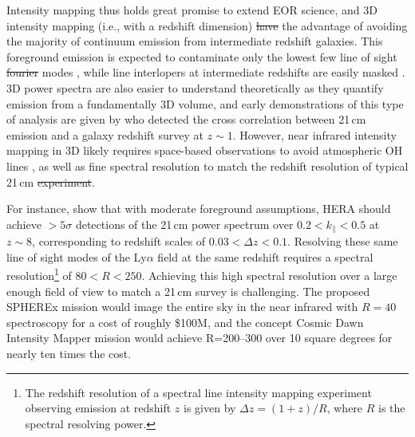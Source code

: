 \documentclass[numberedappendix]{emulateapj}
\providecommand{\DIFadd}[1]{{\protect\color{blue}\uwave{#1}}} %
\providecommand{\DIFdel}[1]{{\protect\color{red}\sout{#1}}}                      %
\providecommand{\DIFaddbegin}{} %
\providecommand{\DIFaddend}{} %
\providecommand{\DIFdelbegin}{} %
\providecommand{\DIFdelend}{} %
\begin{document}
Intensity mapping thus holds great promise to extend EOR science, and 3D intensity mapping (i.e., with a redshift dimension) \DIFdelbegin \DIFdel{have }\DIFdelend \DIFaddbegin \DIFadd{has }\DIFaddend the advantage of avoiding the majority of continuum emission from intermediate redshift galaxies. This foreground emission is expected to contaminate only the lowest few line of sight \DIFdelbegin \DIFdel{fourier }\DIFdelend \DIFaddbegin \DIFadd{Fourier }\DIFaddend modes \citep{gong17}, while line interlopers at intermediate redshifts are easily masked \citep{Gong2014,gong17,pullen14,Comaschi16}. 3D power spectra are also easier to understand theoretically as they quantify emission from a fundamentally 3D volume, and early demonstrations of this type of analysis are given by \citet{Chang2010,Masui2013} who detected the cross correlation between 21\,cm emission and a galaxy redshift survey at $z\sim1$. However, near infrared intensity mapping in 3D likely requires space-based observations to avoid atmospheric OH lines \citep[e.g.][]{sullivan12}, as well as fine spectral resolution to match the redshift resolution of typical 21\,cm \DIFdelbegin \DIFdel{experiment}\DIFdelend \DIFaddbegin \DIFadd{experiments}\DIFaddend . 

For instance, \citet{PoberNextGen} show that with moderate foreground assumptions, HERA should achieve $>5\sigma$ detections of the 21\,cm power spectrum 	over $0.2<k_\parallel<0.5$ at $z\sim8$, corresponding to redshift scales of $0.03<\Delta z<0.1$. Resolving these same line of sight modes of the Ly$\alpha$ field at the same redshift requires a spectral resolution\footnote{The redshift resolution of a spectral line intensity mapping experiment observing emission at redshift $z$ is given by $\Delta z=(1+z)/R$, where $R$ is the spectral resolving power.} of $80<R<250$. Achieving this high spectral resolution over a large enough field of view to match a 21\,cm survey is challenging. The proposed SPHEREx mission \citep{ScienceWithSpherex,SpherexWhitePaper} would image the entire sky in the near infrared with $R=40$ spectroscopy for a cost of roughly \$100M, and the concept Cosmic Dawn Intensity Mapper \citep{cooray16} mission would achieve R=200--300 over 10 square degrees for nearly ten times the cost.
\end{document}
